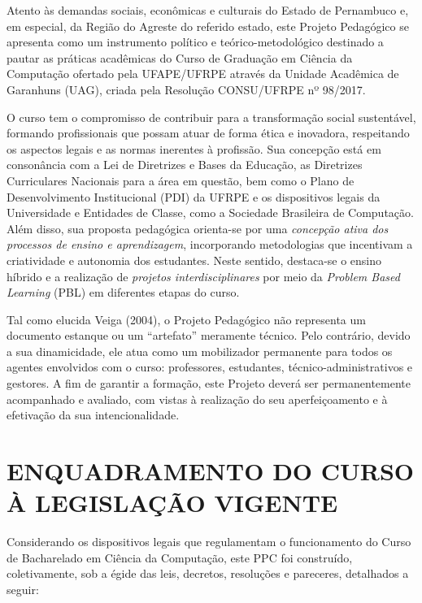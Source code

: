 \documentclass[
	12pt,				%
	openright,			%
  oneside,     %
	a4paper,			%
	chapter=TITLE,		%
	english,			%
	french,				%
	spanish,			%
	brazil				%
	]{abntex2}
\begin{document}
Atento às demandas sociais, econômicas e culturais do Estado de Pernambuco e, em especial, da Região do Agreste do referido estado, este Projeto Pedagógico se apresenta como um instrumento político e teórico-metodológico destinado a pautar as práticas acadêmicas do Curso de Graduação em Ciência da Computação ofertado pela UFAPE/UFRPE através da Unidade Acadêmica de Garanhuns (UAG), criada pela Resolução CONSU/UFRPE nº 98/2017.

O curso tem o compromisso de contribuir para a transformação social sustentável, formando profissionais que possam atuar de forma ética e inovadora, respeitando os aspectos legais e as normas inerentes à profissão. Sua concepção está em consonância com a Lei de Diretrizes e Bases da Educação, as Diretrizes Curriculares Nacionais para a área em questão, bem como o Plano de Desenvolvimento Institucional (PDI) da UFRPE e os dispositivos legais da Universidade e Entidades de Classe, como a Sociedade Brasileira de Computação. Além disso, sua proposta pedagógica orienta-se por uma \textit{concepção ativa dos processos de ensino e aprendizagem}, incorporando metodologias que incentivam a criatividade e autonomia dos estudantes. Neste sentido, destaca-se o ensino híbrido e a realização de \textit{projetos interdisciplinares} por meio da \textit{Problem Based Learning} (PBL) em diferentes etapas do curso.

Tal como elucida Veiga (2004), o Projeto Pedagógico não representa um documento estanque ou um ``artefato'' meramente técnico. Pelo contrário, devido a sua dinamicidade, ele atua como um mobilizador permanente para todos os agentes envolvidos com o curso: professores, estudantes, técnico-administrativos e gestores. A fim de garantir a formação, este Projeto deverá ser permanentemente acompanhado e avaliado, com vistas à realização do seu aperfeiçoamento e à efetivação da sua intencionalidade.



\chapter{ENQUADRAMENTO DO CURSO À LEGISLAÇÃO VI\-GEN\-TE}

Considerando os dispositivos legais que regulamentam o funcionamento do Curso de Bacharelado em Ciência da Computação, este PPC foi construído, coletivamente, sob a égide das leis, decretos, resoluções e pareceres, detalhados a seguir:
\end{document}
